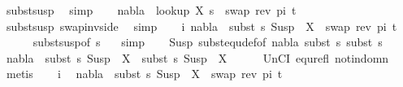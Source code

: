 \begin{isabellebody}
\ subst{\isacharunderscore}{\kern0pt}susp\ \isamarkupfalse%
\ simp\isanewline
\ \ \isamarkupfalse%
\ {\isachardoublequoteopen}nabla\ {\isasymturnstile}\ {\isacharparenleft}{\kern0pt}look{\isacharunderscore}{\kern0pt}up\ X\ s{}{\isacharparenright}{\kern0pt}\ {\isasymapprox}\ swap\ {\isacharparenleft}{\kern0pt}rev\ pi{\isacharparenright}{\kern0pt}\ t{}{\isachardoublequoteclose}\isanewline
\ \ \ \ \isamarkupfalse%
\ subst{\isacharunderscore}{\kern0pt}susp\ swap{\isacharunderscore}{\kern0pt}inv{\isacharunderscore}{\kern0pt}side\ \isamarkupfalse%
\ simp\isanewline
\ \ \isamarkupfalse%
\ i{\isacharcolon}{\kern0pt}\ {\isachardoublequoteopen}nabla\ {\isasymturnstile}\ subst\ s{}\ {\isacharparenleft}{\kern0pt}Susp\ {\isacharbrackleft}{\kern0pt}{\isacharbrackright}{\kern0pt}\ X{\isacharparenright}{\kern0pt}\ {\isasymapprox}\ swap\ {\isacharparenleft}{\kern0pt}rev\ pi{\isacharparenright}{\kern0pt}\ t{}{\isachardoublequoteclose}\isanewline
\ \ \ \ \isamarkupfalse%
\ subst{\isacharunderscore}{\kern0pt}susp{\isacharbrackleft}{\kern0pt}of\ s{}\ {\isacartoucheopen}{\isacharbrackleft}{\kern0pt}{\isacharbrackright}{\kern0pt}{\isacartoucheclose}{\isacharbrackright}{\kern0pt}\ \isamarkupfalse%
\ simp\isanewline
\isanewline
\ \ \isamarkupfalse%
\ Susp{\isacharparenleft}{\kern0pt}{}{\isacharparenright}{\kern0pt}\ subst{\isacharunderscore}{\kern0pt}equ{\isacharunderscore}{\kern0pt}def{\isacharbrackleft}{\kern0pt}of\ nabla\ {\isacartoucheopen}subst\ s{}{\isacartoucheclose}\ {\isacartoucheopen}subst\ s{}{\isacartoucheclose}{\isacharbrackright}{\kern0pt}\isanewline
\ \ \isamarkupfalse%
\ {\isachardoublequoteopen}nabla\ {\isasymturnstile}\ subst\ s{}\ {\isacharparenleft}{\kern0pt}Susp\ {\isacharbrackleft}{\kern0pt}{\isacharbrackright}{\kern0pt}\ X{\isacharparenright}{\kern0pt}\ {\isasymapprox}\ subst\ s{}\ {\isacharparenleft}{\kern0pt}Susp\ {\isacharbrackleft}{\kern0pt}{\isacharbrackright}{\kern0pt}\ X{\isacharparenright}{\kern0pt}{\isachardoublequoteclose}\isanewline
\ \ \ \ \isamarkupfalse%
\ UnCI\ equ{\isacharunderscore}{\kern0pt}refl\ not{\isacharunderscore}{\kern0pt}in{\isacharunderscore}{\kern0pt}domn\ \isamarkupfalse%
\ metis\isanewline
\isanewline
\ \ \isamarkupfalse%
\ i\ \isamarkupfalse%
\ {\isachardoublequoteopen}nabla\ {\isasymturnstile}\ subst\ s{}\ {\isacharparenleft}{\kern0pt}Susp\ {\isacharbrackleft}{\kern0pt}{\isacharbrackright}{\kern0pt}\ X{\isacharparenright}{\kern0pt}\ {\isasymapprox}\ swap\ {\isacharparenleft}{\kern0pt}rev\ pi{\isacharparenright}{\kern0pt}\ t{}{\isachardoublequoteclose}\isanewline

\end{isabellebody}
